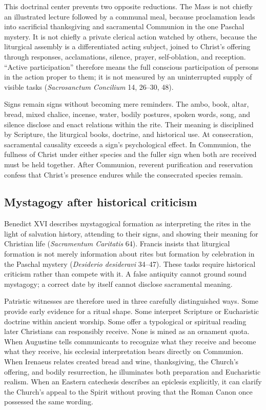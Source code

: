 {This doctrinal center prevents two opposite reductions. The Mass is not chiefly an illustrated lecture followed by a communal meal, because proclamation leads into sacrificial thanksgiving and sacramental Communion in the one Paschal mystery. It is not chiefly a private clerical action watched by others, because the liturgical assembly is a differentiated acting subject, joined to Christ's offering through responses, acclamations, silence, prayer, self-oblation, and reception. ``Active participation'' therefore means the full conscious participation of persons in the action proper to them; it is not measured by an uninterrupted supply of visible tasks (\emph{Sacrosanctum Concilium} 14, 26--30, 48).

Signs remain signs without becoming mere reminders. The ambo, book, altar, bread, mixed chalice, incense, water, bodily postures, spoken words, song, and silence disclose and enact relations within the rite. Their meaning is disciplined by Scripture, the liturgical books, doctrine, and historical use. At consecration, sacramental causality exceeds a sign's psychological effect. In Communion, the fullness of Christ under either species and the fuller sign when both are received must be held together. After Communion, reverent purification and reservation confess that Christ's presence endures while the consecrated species remain.

\subsection{Mystagogy after historical criticism}

Benedict XVI describes mystagogical formation as interpreting the rites in the light of salvation history, attending to their signs, and showing their meaning for Christian life (\emph{Sacramentum Caritatis} 64). Francis insists that liturgical formation is not merely information about rites but formation by celebration in the Paschal mystery (\emph{Desiderio desideravi} 34--47). These tasks require historical criticism rather than compete with it. A false antiquity cannot ground sound mystagogy; a correct date by itself cannot disclose sacramental meaning.

Patristic witnesses are therefore used in three carefully distinguished ways. Some provide early evidence for a ritual shape. Some interpret Scripture or Eucharistic doctrine within ancient worship. Some offer a typological or spiritual reading later Christians can responsibly receive. None is mined as an ornament quota. When Augustine tells communicants to recognize what they receive and become what they receive, his ecclesial interpretation bears directly on Communion. When Irenaeus relates created bread and wine, thanksgiving, the Church's offering, and bodily resurrection, he illuminates both preparation and Eucharistic realism. When an Eastern catechesis describes an epiclesis explicitly, it can clarify the Church's appeal to the Spirit without proving that the Roman Canon once possessed the same wording.

}
